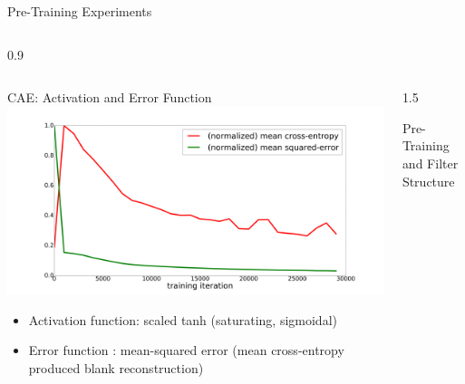 \documentclass[final]{beamer}
\newlength{\onecolwid}
\newlength{\threecolwid}
\begin{document}
\begin{frame}[t]
\begin{columns}[t]
\begin{column}{\threecolwid}
\begin{alertblock}{Pre-Training Experiments}
\begin{columns}[t, totalwidth=0.9\threecolwid]
\begin{column}{0.9\onecolwid}

\end{column}
\end{columns}

\end{alertblock}


\end{column}
\end{columns} %


\begin{columns}[t]

	\begin{column}{\onecolwid}

		\begin{alertblock}{CAE: Activation and Error Function}
			\centering
			\includegraphics[width=.7\linewidth]{graphics/mse_ce_comparison.png}

			\begin{itemize}
				\item Activation function: scaled tanh (saturating, sigmoidal)
				\item Error function     : mean-squared error (mean cross-entropy produced blank reconstruction)
			\end{itemize}

		\end{alertblock}

	\end{column}


	\begin{column}{1.5\onecolwid}

		\begin{alertblock}{Pre-Training and Filter Structure}


\end{alertblock}
\end{column}
\end{columns}
\end{frame}
\end{document}
